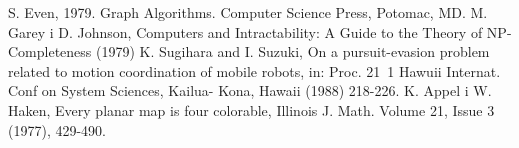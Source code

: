 \documentclass[brudnopis]{xmgr}
\theoremstyle{definition}
\begin{document}
\begin{bibdiv}
\begin{biblist}
  S. Even, 1979. Graph Algorithms. Computer Science Press, Potomac, MD.
  M. Garey i D. Johnson, Computers and Intractability: A Guide to the Theory of NP-Completeness (1979)
  K. Sugihara  and I. Suzuki,  On a pursuit-evasion  problem related  to motion  coordination  of mobile robots,  in: Proc. 21~1 Hawuii  Internat.  Conf  on System  Sciences,  Kailua- Kona,   Hawaii  (1988) 218-226.
  K. Appel i W. Haken, Every planar map is four colorable, Illinois J. Math. Volume 21, Issue 3 (1977), 429-490. 
\end{biblist}
\end{bibdiv}

\listoffigures

\oswiadczenie
\end{document}
